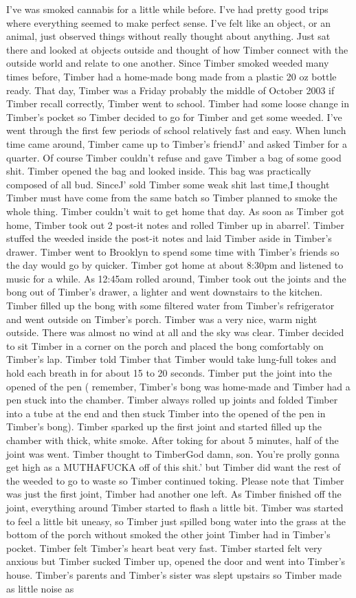 \documentclass[12pt]{book}
\begin{document}
I've was smoked cannabis for a little while before. I've had pretty good trips where everything seemed to make perfect sense. I've felt like an object, or an animal, just observed things without really thought about anything. Just sat there and looked at objects outside and thought of how Timber connect with the outside world and relate to one another. Since Timber smoked weeded many times before, Timber had a home-made bong made from a plastic 20 oz bottle ready. That day, Timber was a Friday probably the middle of October 2003 if Timber recall correctly, Timber went to school. Timber had some loose change in Timber's pocket so Timber decided to go for Timber and get some weeded. I've went through the first few periods of school relatively fast and easy. When lunch time came around, Timber came up to Timber's friendJ' and asked Timber for a quarter. Of course Timber couldn't refuse and gave Timber a bag of some good shit. Timber opened the bag and looked inside. This bag was practically composed of all bud. SinceJ' sold Timber some weak shit last time,I thought Timber must have come from the same batch so Timber planned to smoke the whole thing. Timber couldn't wait to get home that day. As soon as Timber got home, Timber took out 2 post-it notes and rolled Timber up in abarrel'. Timber stuffed the weeded inside the post-it notes and laid Timber aside in Timber's drawer. Timber went to Brooklyn to spend some time with Timber's friends so the day would go by quicker. Timber got home at about 8:30pm and listened to music for a while. As 12:45am rolled around, Timber took out the joints and the bong out of Timber's drawer, a lighter and went downstairs to the kitchen. Timber filled up the bong with some filtered water from Timber's refrigerator and went outside on Timber's porch. Timber was a very nice, warm night outside. There was almost no wind at all and the sky was clear. Timber decided to sit Timber in a corner on the porch and placed the bong comfortably on Timber's lap. Timber told Timber that Timber would take lung-full tokes and hold each breath in for about 15 to 20 seconds. Timber put the joint into the opened of the pen ( remember, Timber's bong was home-made and Timber had a pen stuck into the chamber. Timber always rolled up joints and folded Timber into a tube at the end and then stuck Timber into the opened of the pen in Timber's bong). Timber sparked up the first joint and started filled up the chamber with thick, white smoke. After toking for about 5 minutes, half of the joint was went. Timber thought to TimberGod damn, son. You're prolly gonna get high as a MUTHAFUCKA off of this shit.' but Timber did want the rest of the weeded to go to waste so Timber continued toking. Please note that Timber was just the first joint, Timber had another one left. As Timber finished off the joint, everything around Timber started to flash a little bit. Timber was started to feel a little bit uneasy, so Timber just spilled bong water into the grass at the bottom of the porch without smoked the other joint Timber had in Timber's pocket. Timber felt Timber's heart beat very fast. Timber started felt very anxious but Timber sucked Timber up, opened the door and went into Timber's house. Timber's parents and Timber's sister was slept upstairs so Timber made as little noise as 
\end{document}
